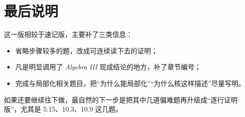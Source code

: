 \documentclass[a4paper]{ctexart}
\begin{document}
\section*{最后说明}
{}

这一版相较于速记版，主要补了三类信息：
\begin{itemize}
  \item 省略步骤较多的题，改成可连续读下去的证明；
  \item 凡是明显调用了 \textit{Algebra III} 现成结论的地方，补了章节编号；
  \item 完成与局部化相关题目，把“为什么能局部化”“为什么核这样描述”尽量写明。
\end{itemize}

如果还要继续往下做，最自然的下一步是把其中几道偏难题再升级成“逐行证明版”，尤其是 5.15、10.3、10.9 这几题。
\end{document}
